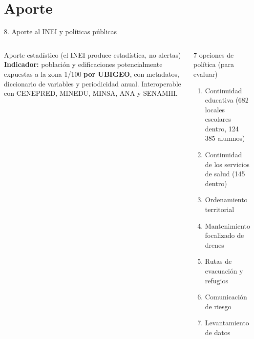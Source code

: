 \documentclass[aspectratio=169,11pt]{beamer}
\begin{document}
\section{Aporte}
\begin{frame}{8. Aporte al INEI y políticas públicas}
\begin{columns}[T]
\begin{block}{Aporte estadístico (el INEI produce estadística, no alertas)}\small
\textbf{Indicador:} población y edificaciones potencialmente expuestas a la zona 1/100 \textbf{por UBIGEO}, con metadatos, diccionario de variables y periodicidad anual. Interoperable con CENEPRED, MINEDU, MINSA, ANA y SENAMHI.
\end{block}
\begin{block}{7 opciones de política (para evaluar)}\small
\begin{enumerate}
\item Continuidad educativa (682 locales escolares dentro, 124\,385 alumnos)
\item Continuidad de los servicios de salud (145 dentro)
\item Ordenamiento territorial
\item Mantenimiento focalizado de drenes
\item Rutas de evacuación y refugios
\item Comunicación de riesgo
\item Levantamiento de datos
\end{enumerate}
\end{block}
\end{columns}
\end{frame}

\end{document}
